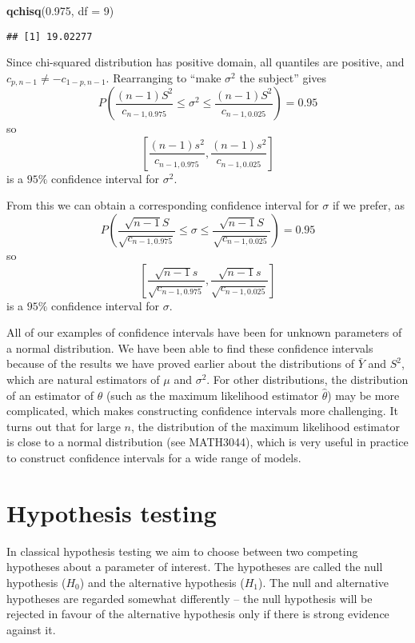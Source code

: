 \documentclass[]{book}
\newenvironment{Shaded}{\begin{snugshade}}{\end{snugshade}}
\newcommand{\KeywordTok}[1]{\textcolor[rgb]{0.13,0.29,0.53}{\textbf{#1}}}
\newcommand{\DataTypeTok}[1]{\textcolor[rgb]{0.13,0.29,0.53}{#1}}
\newcommand{\DecValTok}[1]{\textcolor[rgb]{0.00,0.00,0.81}{#1}}
\newcommand{\FloatTok}[1]{\textcolor[rgb]{0.00,0.00,0.81}{#1}}
\newcommand{\NormalTok}[1]{#1}
\theoremstyle{definition}
\theoremstyle{definition}
\theoremstyle{definition}
\theoremstyle{remark}
\begin{document}
\begin{Shaded}
\begin{Highlighting}[]
\KeywordTok{qchisq}\NormalTok{(}\FloatTok{0.975}\NormalTok{, }\DataTypeTok{df =} \DecValTok{9}\NormalTok{)}
\end{Highlighting}
\end{Shaded}

\begin{verbatim}
## [1] 19.02277
\end{verbatim}

Since chi-squared distribution has positive domain, all quantiles are
positive, and \(c_{p, n-1} \not = - c_{1 - p, n-1}\). Rearranging to
``make \(\sigma^2\) the subject'' gives
\[P\left(\frac{(n-1) S^2}{c_{n-1, 0.975}} \leq \sigma^2
  \leq \frac{(n-1) S^2}{c_{n-1, 0.025}}\right) = 0.95\] so
\[\left[\frac{(n-1) s^2}{c_{n-1, 0.975}}, \frac{(n-1) s^2}{c_{n-1, 0.025}}\right]\]
is a \(95\%\) confidence interval for \(\sigma^2\).

From this we can obtain a corresponding confidence interval for
\(\sigma\) if we prefer, as
\[P\left(\frac{\sqrt{n-1} S}{\sqrt{c_{n-1, 0.975}}} \leq \sigma
  \leq \frac{\sqrt{n-1} S}{\sqrt{c_{n-1, 0.025}}}\right) = 0.95\] so
\[\left[\frac{\sqrt{n-1} s}{\sqrt{c_{n-1, 0.975}}},
  \frac{\sqrt{n-1} s}{\sqrt{c_{n-1, 0.025}}}\right]\] is a \(95\%\)
confidence interval for \(\sigma\).

All of our examples of confidence intervals have been for unknown
parameters of a normal distribution. We have been able to find these
confidence intervals because of the results we have proved earlier about
the distributions of \(\bar Y\) and \(S^2\), which are natural
estimators of \(\mu\) and \(\sigma^2\). For other distributions, the
distribution of an estimator of \(\theta\) (such as the maximum
likelihood estimator \(\hat \theta\)) may be more complicated, which
makes constructing confidence intervals more challenging. It turns out
that for large \(n\), the distribution of the maximum likelihood
estimator is close to a normal distribution (see MATH3044), which is
very useful in practice to construct confidence intervals for a wide
range of models.

\section{Hypothesis testing}\label{hypothesis-testing}

In classical hypothesis testing we aim to choose between two competing
hypotheses about a parameter of interest. The hypotheses are called the
null hypothesis (\(H_0\)) and the alternative hypothesis (\(H_1\)). The
null and alternative hypotheses are regarded somewhat differently -- the
null hypothesis will be rejected in favour of the alternative hypothesis
only if there is strong evidence against it.
\end{document}
